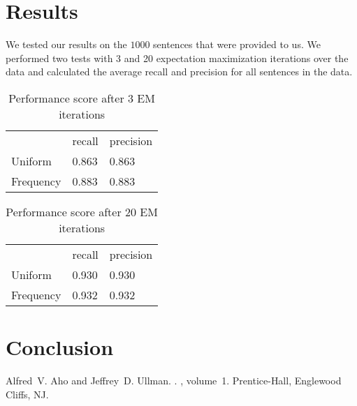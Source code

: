 \documentclass[11pt]{article}
\begin{document}
\section{Results}
\label{results}
We tested our results on the $1000$ sentences that were provided to us. We performed two tests with 3 and 20 expectation maximization iterations over the data and calculated the average recall and precision for all sentences in the data. 

\begin{table}[H]
    \begin{tabular}{lll}
    ~ & recall  & precision \\
    Uniform & 0.863 & 0.863 \\
    Frequency & 0.883 & 0.883 \\
    \end{tabular}
    \caption{Performance score after 3 EM iterations}
\end{table}

\begin{table}[H]
    \begin{tabular}{lll}
    ~ & recall  & precision \\
    Uniform & 0.930 & 0.930 \\
    Frequency & 0.932 & 0.932 \\
    \end{tabular}
    \caption{Performance score after 20 EM iterations}
\end{table}


\section{Conclusion}

\begin{thebibliography}{}

Alfred~V. Aho and Jeffrey~D. Ullman.
.
, volume~1.
\newblock Prentice-{Hall}, Englewood Cliffs, NJ.


\end{thebibliography}
\end{document}
